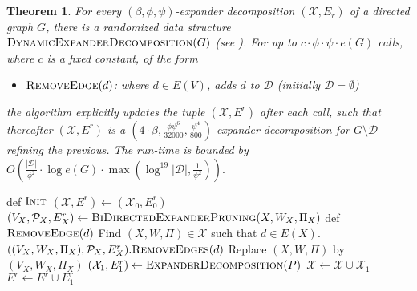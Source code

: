 \documentclass[11pt]{article}
\newtheorem{theorem}{Theorem}[section]
\begin{document}
\begin{theorem}\label{thm:DED}For every $(\beta, \phi, \psi)$-expander decomposition $(\mathcal{X}, E_r)$ of a directed graph $G$, there is a randomized data structure $\textsc{DynamicExpanderDecomposition}(G)$ (see ). For up to $c \cdot \phi \cdot \psi \cdot e(G)$ calls, where $c$ is a fixed constant, of the form
\begin{itemize}
    \item $\textsc{RemoveEdge}(d)$: where $d \in E(V)$, adds $d$ to $\mathcal{D}$ (initially $\mathcal{D} = \emptyset$)
\end{itemize}
the algorithm explicitly updates the tuple $(\mathcal{X}, E^r)$ after each call, such that thereafter $(\mathcal{X}, E^r)$ is a $\left(4 \cdot \beta, \frac{\phi \psi^6}{32000}, \frac{\psi^4}{800}\right)$-expander-decomposition for $G \setminus \mathcal{D}$ refining the previous. The run-time is bounded by $O\left(\frac{|\mathcal{D}|}{\phi^2} \cdot \log e(G) \cdot \max\left(\log^{19}|\mathcal{D}|, \frac{1}{\psi^2}\right)\right).$
\end{theorem}

\begin{algorithm}[H]
    \begin{algorithmic}[1]
    \caption{$\textsc{DynamicExpanderDecomposition}(\mathcal{X}_0, E^r_0)$}\label{alg:DynamicExpanderDecomposition}
    \State def $\textsc{Init}$
    \Indent
    \State $(\mathcal{X}, E^r) \leftarrow (\mathcal{X}_0, E^r_0)$
    \State $(V_X, \mathcal{P}_X, E^r_X) \leftarrow \textsc{BiDirectedExpanderPruning}(X, W_X, \Pi_X)$
    \EndFor
    \EndIndent
    \State 
    \State def $\textsc{RemoveEdge}(d)$
    \Indent
    \State Find $(X, W, \Pi) \in \mathcal{X}$ such that $d \in E(X)$.
    \State $((V_X, W_X, \Pi_X), \mathcal{P}_X,E^r_X).\textsc{RemoveEdges}(d)$
    \State Replace $(X, W, \Pi)$ by $(V_X, W_X, \Pi_X)$
    \State $(\mathcal{X}_1, E^r_1) \leftarrow \textsc{ExpanderDecomposition}(P)$ \label{alg:DynExpDec-line12}
    \State $\mathcal{X} \leftarrow \mathcal{X} \cup \mathcal{X}_1$
    \State $E^r \leftarrow E^r \cup E^r_1$
    \EndFor
    \EndIndent
    \end{algorithmic}
\end{algorithm}
\end{document}

